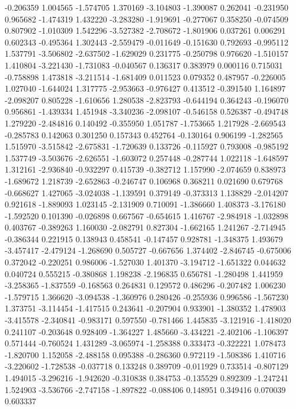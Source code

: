 -0.206359
1.004565
-1.574705
1.370169
-3.104803
-1.390087
0.262041
-0.231950
0.965682
-1.474319
1.432220
-3.283280
-1.919691
-0.277067
0.358250
-0.074509
0.807902
-1.010309
1.542296
-3.527382
-2.708672
-1.801906
0.037261
0.006291
0.602343
-0.495364
1.302443
-2.559479
-0.011649
-0.151630
0.792693
-0.995112
1.537791
-3.506802
-2.637502
-1.629029
0.231775
-0.250798
0.976620
-1.510157
1.410804
-3.221430
-1.731083
-0.040567
0.136317
0.383979
0.000116
0.715031
-0.758898
1.473818
-3.211514
-1.681409
0.011523
0.079352
0.487957
-0.226005
1.027040
-1.644024
1.317775
-2.953663
-0.976427
0.413512
-0.391540
1.164897
-2.098207
0.805228
-1.610656
1.280538
-2.823793
-0.644194
0.364243
-0.196070
0.956861
-1.439334
1.451948
-3.340236
-2.098107
-0.546158
0.526387
-0.494748
1.279220
-2.484816
0.140492
-0.355950
1.051787
-1.753665
1.217928
-2.669543
-0.285783
0.142063
0.301250
0.157343
0.452764
-0.130164
0.906199
-1.282565
1.515970
-3.515842
-2.675831
-1.720639
0.133726
-0.115927
0.793008
-0.985192
1.537749
-3.503676
-2.626551
-1.603072
0.257448
-0.287744
1.022118
-1.648597
1.312161
-2.936840
-0.932297
0.415739
-0.382712
1.157990
-2.074659
0.838973
-1.689672
1.218739
-2.652863
-0.246747
0.106968
0.368211
0.021690
0.679768
-0.668627
1.427065
-3.024038
-1.139591
0.379149
-0.373313
1.138829
-2.014207
0.921618
-1.889093
1.023145
-2.131909
0.710091
-1.386660
1.408373
-3.176180
-1.592520
0.101390
-0.026898
0.667567
-0.654615
1.416767
-2.984918
-1.032898
0.403767
-0.389263
1.160030
-2.082791
0.827304
-1.662165
1.241267
-2.714945
-0.386344
0.221915
0.138943
0.458541
-0.147457
0.928781
-1.348375
1.493679
-3.457417
-2.479124
-1.268690
0.505727
-0.667656
1.374402
-2.846745
-0.675006
0.372042
-0.220251
0.986006
-1.527030
1.401370
-3.194712
-1.651322
0.044632
0.040724
0.555215
-0.380868
1.198238
-2.196835
0.656781
-1.280498
1.441959
-3.258365
-1.837559
-0.168563
0.264831
0.129572
0.486296
-0.207482
1.006230
-1.579715
1.366620
-3.094538
-1.360976
0.280426
-0.255936
0.996586
-1.567230
1.373751
-3.114454
-1.417515
0.243641
-0.207904
0.933901
-1.380352
1.478903
-3.415578
-2.340841
-0.983171
0.597550
-0.781466
1.445835
-3.121916
-1.418020
0.241107
-0.203648
0.928409
-1.364227
1.485660
-3.434221
-2.402106
-1.106397
0.571444
-0.760524
1.431289
-3.065974
-1.258388
0.333473
-0.322221
1.078473
-1.820700
1.152058
-2.488158
0.095388
-0.286360
0.972119
-1.508386
1.410716
-3.220602
-1.728538
-0.037718
0.133248
0.389709
-0.011929
0.733514
-0.807129
1.494015
-3.296216
-1.942620
-0.310838
0.384753
-0.135529
0.892309
-1.247241
1.524903
-3.536766
-2.747158
-1.897822
-0.088406
0.148951
0.349416
0.070039
0.603337
